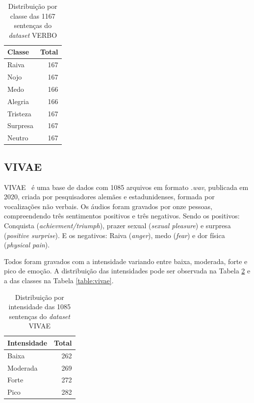 \begin{table}[]
\centering
\caption{Distribuição por classe das 1167 sentenças do \textit{dataset} VERBO}
    \begin{tabular}{|l|r|}
    \hline
        Classe & Total \\ \hline
        Raiva & 167  \\ \hline
        Nojo & 167  \\ \hline
        Medo & 166  \\ \hline
        Alegria & 166  \\ \hline
        Tristeza & 167  \\ \hline
        Surpresa & 167  \\ \hline
        Neutro & 167  \\ \hline
    \end{tabular}\label{table:verbo}
\end{table}

\subsection{VIVAE}\label{subsection:vivae}

\acrlong{VIVAE}~\cite{16} é uma base de dados com 1085 arquivos em formato \textit{.wav}, publicada em 2020, criada por pesquisadores alemães e estadunidenses, formada por vocalizações não verbais. Os áudios foram gravados por onze pessoas, compreendendo três sentimentos positivos e três negativos. Sendo os positivos: Conquista (\textit{achievment/triumph}), prazer sexual (\textit{sexual pleasure}) e surpresa (\textit{positive surprise}). E os negativos: Raiva (\textit{anger}), medo (\textit{fear}) e dor física (\textit{physical pain}).

Todos foram gravados com a intensidade variando entre baixa, moderada, forte e pico de emoção. A distribuição das intensidades pode ser observada na Tabela \ref{table:vivaeintensidade} e a das classes na Tabela \ref{table:vivae}.

\begin{table}[]
    \centering
    \caption{Distribuição por intensidade das 1085 sentenças do \textit{dataset} VIVAE}
    \begin{tabular}{|l|r|}
    \hline
        Intensidade & Total  \\ \hline
        Baixa & 262  \\ \hline
        Moderada & 269  \\ \hline
        Forte & 272  \\ \hline
        Pico & 282  \\ \hline
    \end{tabular}\label{table:vivaeintensidade}
\end{table}

